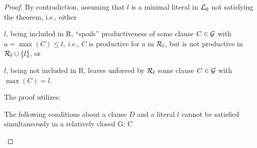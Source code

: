 \begin{proof} By contradiction, assuming that $l$ is a minimal literal 
in \(\mbox {$\cal L$}_0\) not satisfying the theorem, i.e., either
\begin{description}\smallerspaces
\item[B1.] $l$, being included in \C R, ``spoils'' productiveness of some 
  clause \(C\in\mbox {$\cal G$}\) with \(a=\max (C) \leq l\), {\em i.e.}, $C$ is
  productive for $a$ in \(\mbox {$\cal R$}_l\), but is not productive in \(\mbox {$\cal R$}_l\cup\{l\}\), or
\item[B2.] $l$, being not included in \C R, leaves unforced by \(\mbox {$\cal R$}_l\) 
  some clause \(C\in\mbox {$\cal G$}\) with \(\max (C)=l\).
\end{description}
The proof utilizes:
\begin{lemma}\label {le:contradiction-way}
The following conditions about a clause $D$ and a literal $l$ cannot be 
satisfied simultaneously in a relatively closed \C G:
\newITEM C
\end{lemma}

\end{proof}

